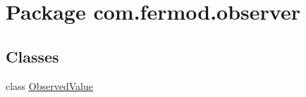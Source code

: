 \hypertarget{a00018}{}\section{Package com.\+fermod.\+observer}
\label{a00018}
\subsection*{Classes}
\begin{DoxyCompactItemize}
\item 
class \mbox{\hyperlink{a00034}{Observed\+Value}}
\end{DoxyCompactItemize}
